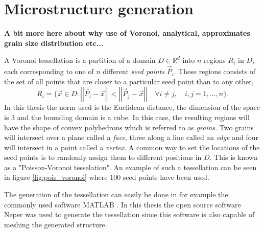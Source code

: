 \documentclass[micro_gen.tex]{subfiles}
\begin{document}
\chapter{Microstructure generation}

\textbf{A bit more here about why use of Voronoi, analytical, approximates grain size distribution etc...}

A Voronoi tessellation is a partition of a domain $D \in \mathbb{R}^d$ into $n$ regions $R_i$ in $D$, each corresponding to one of $n$ different \textit{seed points} $\vec{P}_i$. These regions consists of the set of all points that are closer to a particular seed point than to any other,
%
\[R_i = \{ \vec{x} \in D : \left|\left| \vec{P}_i - \vec{x} \right|\right| < \left|\left| \vec{P}_j - \vec{x} \right|\right| \quad  \forall i \neq j, \quad i,j = 1, \ldots, n \}. \]
%
In this thesis the norm used is the Euclidean distance, the dimension of the space is 3 and the bounding domain is a cube. In this case, the resulting regions will have the shape of convex polyhedrons which is referred to as \textit{grains}. Two grains will intersect over a plane called a \textit{face}, three along a line called an \textit{edge} and four will intersect in a point called a \textit{vertex}.
A common way to set the locations of the seed points is to randomly assign them to different positions in $D$. This is known as a "Poisson-Voronoi tesselation". An example of such a tessellation can be seen in figure \ref{fig:pois_voronoi} where 100 seed points have been used.

The generation of the tessellation can easily be done in for example the commonly used software MATLAB \cite{matlab:voronoi}. In this thesis the open source software Neper \cite{Quey20111729} was used to generate the tessellation since this software is also capable of meshing the generated structure. 
\end{document}
